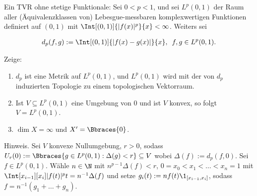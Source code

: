 \begin{exercise}

Ein TVR ohne stetige Funktionale: Sei $0 < p < 1$, und sei $L^p(0, 1)$ der Raum aller (Äquivalenzklassen von) Lebesgue-messbaren komplexwertigen Funktionen definiert auf $(0, 1)$ mit $\Int[(0,1)]{|f(x)|^p}{x} < \infty$.
Weiters sei

\begin{align*}
  d_p(f, g)
  :=
  \Int[(0, 1)]{|f(x) - g(x)|}{x},
  \enspace
  f, g \in L^p(0, 1).
\end{align*}

Zeige:

\begin{enumerate}[label = (\alph*)]
  \item $d_p$ ist eine Metrik auf $L^p(0, 1)$, und $L^p(0, 1)$ wird mit der von $d_p$ induzierten Topologie zu einem topologischen Vektorraum.
  \item Ist $V \subseteq L^p(0, 1)$ eine Umgebung von $0$ und ist $V$ konvex, so folgt $V = L^p(0, 1)$.
  \item $\dim{X} = \infty$ und $X^\prime = \Bbraces{0}$.
\end{enumerate}

Hinweis.
Sei $V$ konvexe Nullumgebung, $r > 0$, sodass $U_r(0) := \Bbraces{g \in L^p(0, 1): \Delta(g) < r} \subseteq V$ wobei $\Delta(f) := d_p(f, 0)$.
Sei $f \in L^p(0, 1)$.
Wähle $n \in \N$ mit $n^{p-1} \Delta(f) < r$, $0 = x_0 < x_1 < \ldots < x_n = 1$ mit $\Int[x_{i-1}][x_i]{|f(t)|^p}{t} = n^{-1} \Delta(f)$ und setze $g_i(t) := n f(t) \1_{[x_{i-1}, x_i]}$, sodass $f = n^{-1}(g_1 + \ldots + g_n)$.

\end{exercise}

